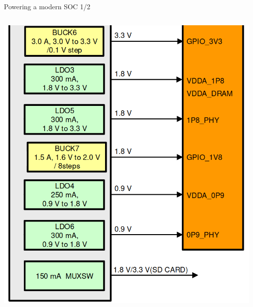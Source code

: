 \documentclass[10pt]{beamer}
\begin{document}
\begin{frame}[t]{Powering a modern SOC 1/2}
\begin{columns}[onlytextwidth]
	\includegraphics[width=1\linewidth]{img/imx8_power_split2.png}
	\end{columns}

\end{frame}


\end{document}
